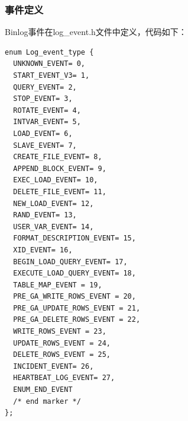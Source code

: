 \documentclass[a4paper, titlepage, 10pt, bookmark]{article}
\begin{document}
\subsubsection{事件定义}
Binlog事件在log\_event.h文件中定义，代码如下：
\begin{spacing}{1.0}
\begin{lstlisting}
enum Log_event_type { 
  UNKNOWN_EVENT= 0, 
  START_EVENT_V3= 1, 
  QUERY_EVENT= 2, 
  STOP_EVENT= 3, 
  ROTATE_EVENT= 4, 
  INTVAR_EVENT= 5, 
  LOAD_EVENT= 6, 
  SLAVE_EVENT= 7, 
  CREATE_FILE_EVENT= 8, 
  APPEND_BLOCK_EVENT= 9, 
  EXEC_LOAD_EVENT= 10, 
  DELETE_FILE_EVENT= 11, 
  NEW_LOAD_EVENT= 12, 
  RAND_EVENT= 13, 
  USER_VAR_EVENT= 14, 
  FORMAT_DESCRIPTION_EVENT= 15, 
  XID_EVENT= 16, 
  BEGIN_LOAD_QUERY_EVENT= 17, 
  EXECUTE_LOAD_QUERY_EVENT= 18, 
  TABLE_MAP_EVENT = 19, 
  PRE_GA_WRITE_ROWS_EVENT = 20, 
  PRE_GA_UPDATE_ROWS_EVENT = 21, 
  PRE_GA_DELETE_ROWS_EVENT = 22, 
  WRITE_ROWS_EVENT = 23, 
  UPDATE_ROWS_EVENT = 24, 
  DELETE_ROWS_EVENT = 25, 
  INCIDENT_EVENT= 26, 
  HEARTBEAT_LOG_EVENT= 27, 
  ENUM_END_EVENT 
  /* end marker */ 
};
\end{lstlisting}
\end{spacing}
\end{document}
